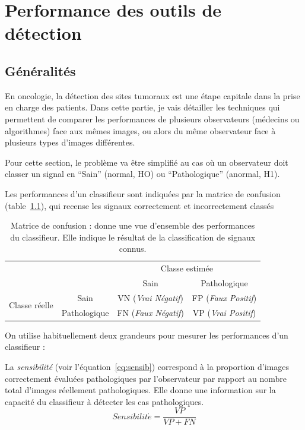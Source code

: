 \chapter{Performance des outils de détection}
\label{lab:chapCAD}
	\section{Généralités}

En oncologie, la détection des sites tumoraux est une étape capitale dans la prise en charge des patients. 
Dans cette partie, je vais détailler les techniques qui permettent de comparer les performances de plusieurs observateurs (médecins ou algorithmes) face aux mêmes images, ou alors du même observateur face à plusieurs types d'images différentes.

Pour cette section, le problème va être simplifié au cas où un observateur doit classer un signal en ``Sain'' (normal, HO) ou ``Pathologique'' (anormal, H1). 

Les performances d'un classifieur sont indiquées par la matrice de confusion (table~\ref{tab:confusion}), qui recense les signaux correctement et incorrectement classés 

\begin{table}[h]
	\label{tab:confusion}
	\begin{tabular}{cc c|c|}
		& & \multicolumn{2}{c}{Classe estimée} \\
		\cline{3-4}	
		& & \multicolumn{1}{|c|}{Sain} & Pathologique \\ 
		\cline{2-4}
		\multicolumn{1}{c|}{\multirow{2}{*}{Classe réelle}} & \multicolumn{1}{|c|}{Sain} & VN (\emph{Vrai Négatif}) & FP (\emph{Faux Positif})\\
		\cline{2-4}
		\multicolumn{1}{c|}{} & \multicolumn{1}{|c|}{Pathologique} & FN (\emph{Faux Négatif}) & VP (\emph{Vrai Positif})\\
		\cline{2-4}
	\end{tabular}
	\caption[Matrice de confusion]{Matrice de confusion : donne une vue
d'ensemble des performances du classifieur. Elle indique le résultat de la
classification de signaux connus.}
\end{table}

On utilise habituellement deux grandeurs pour mesurer les performances d'un classifieur :

La \emph{sensibilité} (voir l'équation~\ref{eq:sensib}) correspond à la proportion d'images correctement évaluées pathologiques par l'observateur par rapport au nombre total d'images réellement pathologiques. Elle donne une information sur la capacité du classifieur à détecter les cas pathologiques.
\label{lab:pressensib}
\begin{equation}
	\label{eq:sensib}
	Sensibilit\acute{e} = \frac{VP}{VP + FN}
\end{equation}


